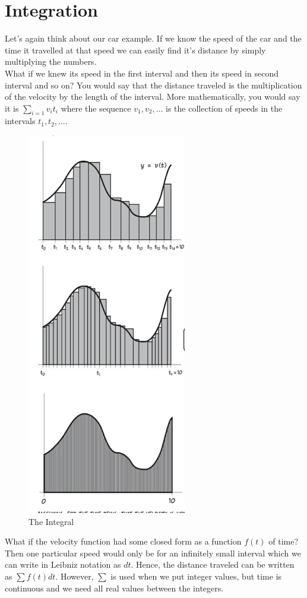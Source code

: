 \section{Integration}
Let's again think about our car example. If we know the speed of the car and the time it travelled at that speed we can easily find it's distance by simply multiplying the numbers.\\
What if we knew its speed in the first interval and then its speed in second interval and so on? You would say that the distance traveled is the multiplication of the velocity by the length of the interval. More mathematically, you would say it is $\sum_{i=1}v_it_i$ where the sequence $v_1,v_2, \dots$ is the collection of speeds in the intervals $t_1,t_2,\dots$.\\
\begin{figure} [H]
    \centering
    \includegraphics[width=0.5\linewidth]{Photos/The integral.png}
    \caption{The Integral}
\end{figure}
What if the velocity function had some closed form as a function $f(t)$ of time? Then one particular speed would only be for an infinitely small interval which we can write in Leibniz notation as $dt$. Hence, the distance traveled can be written as $\sum f(t) dt$. However, $\sum$ is used when we put integer values, but time is continuous and we need all real values between the integers.\\
